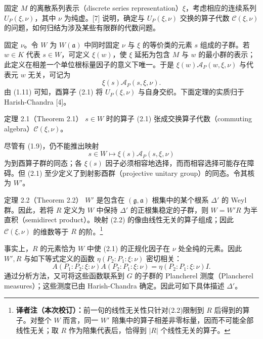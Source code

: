固定 $M$ 的离散系列表示（discrete series representation）$\xi$，考虑相应的连续系列 $U_P(\xi,\nu)$，其中 $\nu$ 为纯虚。[7] 说明，确定与 $U_P(\xi,\nu)$ 交换的算子代数 $\mathcal C(\xi,\nu)$ 的问题，如何归结为涉及某些有限群的代数问题。

固定 $\nu$。令 $W$ 为 $W(\mathfrak a)$ 中同时固定 $\nu$ 与 $\xi$ 的等价类的元素 $s$ 组成的子群。若 $w\in K$ 代表 $s\in W$，可定义 $\xi(w)$，使 $\xi$ 延拓为包含 $M$ 与 $w$ 的最小群的表示；此定义在相差一个单位根标量因子的意义下唯一。于是 $\xi(w)\mathcal A_P(w,\xi,\nu)$ 与代表元 $w$ 无关，可记为
\begin{equation}
 \xi(s)\mathcal A_P(s,\xi,\nu).
 \tag{2.1}
\end{equation}
由 (1.11) 可知，酉算子 (2.1) 将 $U_P(\xi,\nu)$ 与自身交织。下面定理的实质归于 Harish-Chandra [4]。
\begin{originaltheorem}{定理 2.1（Theorem 2.1）}
$s\in W$ 时的算子 (2.1) 张成交换算子代数（commuting algebra）$\mathcal C(\xi,\nu)$。
\end{originaltheorem}
尽管有 (1.9)，仍不能推出映射
\begin{equation}
 s\in W\longmapsto\xi(s)\mathcal A_P(s,\xi,\nu)
 \tag{2.2}
\end{equation}
为到酉算子群的同态；各 $\xi(s)$ 因子必须相容地选择，而而相容选择可能存在障碍。但 (2.1) 至少定义了到射影酉群（projective unitary group）的同态。令其核为 $W'$。
\begin{originaltheorem}{定理 2.2（Theorem 2.2）}
$W'$ 是包含在 $(\mathfrak g,\mathfrak a)$ 根集中的某个根系 $\Delta'$ 的 Weyl 群。因此，若将 $R$ 定义为 $W$ 中保持 $\Delta'$ 的正根集稳定的子群，则 $W=W'R$ 为半直积（semidirect product）。映射 (2.2) 的像由线性无关的算子组成；因此 $\mathcal C(\xi,\nu)$ 的维数等于 $R$ 的阶。\footnote{\textbf{译者注（本次校订）：}前一句的线性无关性只针对(2.2)限制到 $R$ 后得到的算子。对整个 $W$ 而言，同一 $W'$ 陪集中的算子相差非零标量，因而不可能全部线性无关；取 $R$ 作为陪集代表后，恰得到 $|R|$ 个线性无关的算子。}
\end{originaltheorem}
事实上，$R$ 的元素恰为 $W$ 中使 (2.1) 的正规化因子在 $\nu$ 处全纯的元素。因此 $W',R$ 与如下等式定义的函数 $\eta(P_2:P_1:\xi:\nu)$ 密切相关：
\[
 A(P_1:P_2:\xi:\nu)A(P_2:P_1:\xi:\nu)=\eta(P_2:P_1:\xi:\nu)I.
\]
通过分析方法，又可将这些函数联系到 $G$ 的子群的 Plancherel 测度（Plancherel measures）；这些测度已由 Harish-Chandra 确定。因此可如下具体描述 $\Delta'$。

